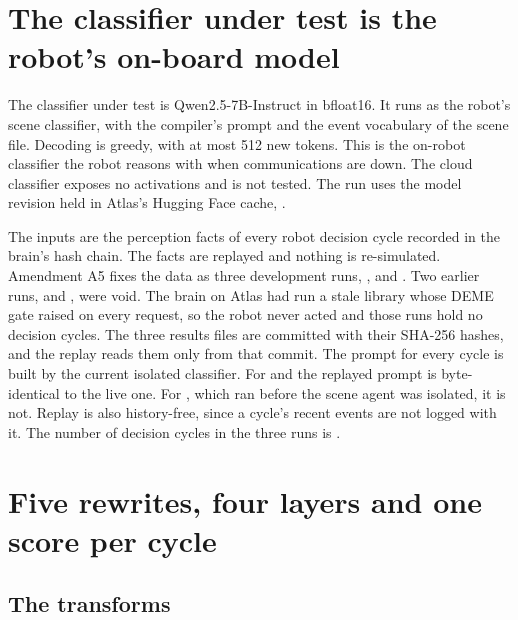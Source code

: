 \section{The classifier under test is the robot's on-board model}

The classifier under test is Qwen2.5-7B-Instruct \cite{qwen2024qwen25} in bfloat16.
It runs as the robot's scene classifier, with the \erisml{} compiler's
 prompt and the event vocabulary of the scene file.
Decoding is greedy, with at most 512 new tokens.
This is the on-robot classifier the robot reasons with when communications are down.
The cloud classifier exposes no activations and is not tested.
The run uses the model revision held in Atlas's Hugging Face cache, .

The inputs are the perception facts of every robot decision cycle recorded in the brain's
hash chain.
The facts are replayed and nothing is re-simulated.
Amendment A5 fixes the data as three development runs, ,  and
.
Two earlier runs,  and , were void.
The brain on Atlas had run a stale library whose DEME gate raised on every request, so the
robot never acted and those runs hold no decision cycles.
The three results files are committed with their SHA-256 hashes, and the replay reads them only
from that commit.
The prompt for every cycle is built by the current isolated classifier.
For  and  the replayed prompt is byte-identical to the live one.
For , which ran before the scene agent was isolated, it is not.
Replay is also history-free, since a cycle's recent events are not logged with it.
The number of decision cycles in the three runs is .

\section{Five rewrites, four layers and one score per cycle}

\subsection{The transforms}

